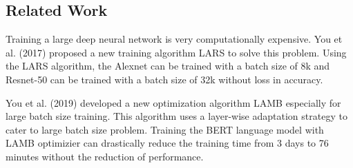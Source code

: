 \subsection*{Related Work}
Training a large deep neural network is very computationally expensive. You et al. (2017) proposed a new training algorithm LARS to solve this problem. Using the LARS algorithm, the Alexnet can be trained with a batch size of 8k and Resnet-50 can be trained with a batch size of 32k without loss in accuracy.

You et al. (2019) developed a new optimization algorithm LAMB especially for large batch size training. This algorithm uses a layer-wise adaptation strategy to cater to large batch size problem. Training the BERT language model with LAMB optimizier can drastically reduce the training time from 3 days to 76 minutes without the reduction of performance.